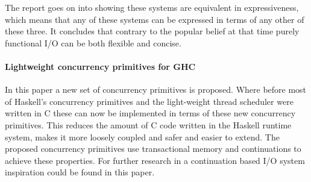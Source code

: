 The report goes on into showing these systems are equivalent in expressiveness, which means that any of these systems can be expressed in terms of any other of these three.
It concludes that contrary to the popular belief at that time purely functional I/O can be both flexible and concise.

\paragraph{Lightweight concurrency primitives for GHC \cite{lw-concurrency}}
In this paper a new set of concurrency primitives is proposed. Where before most of Haskell's concurrency primitives and the light-weight thread scheduler were written in C these can now be implemented in terms of these new concurrency primitives. This reduces the amount of C code written in the Haskell runtime system, makes it more loosely coupled and safer and easier to extend.
The proposed concurrency primitives use transactional memory and continuations to achieve these properties. For further research in a continuation based I/O system inspiration could be found in this paper. 
